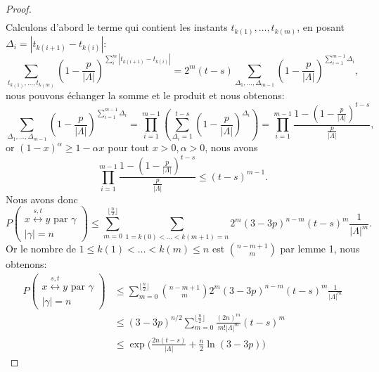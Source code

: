 \documentclass[titlepage,a4paper,12pt]{article}
\newcounter{d}
\newcounter{t}
\newcounter{p}
\newcounter{c}
\newcounter{a}
\newcounter{l}
\begin{document}
\begin{proof}
\begin{multline*}
\end{multline*}
Calculons d'abord le terme qui contient les instants $t_{k(1)},\dots,t_{k(m)}$, en posant $\Delta_i = |t_{k(i+1)}-t_{k(i)}|$:
$$\sum_{t_{k(1)},\dots,t_{k(m)}}(1-\frac{p}{|\Lambda|})^{\sum_i^{m}|t_{k(i+1)}-t_{k(i)}|} = 2^m(t-s)\sum_{\Delta_1,\dots,\Delta_{m-1}}(1-\frac{p}{|\Lambda|})^{\sum_{i=1}^{m-1}\Delta_i},
$$
nous pouvons échanger la somme et le produit et nous obtenons:
$$\sum_{\Delta_1,\dots,\Delta_{m-1}}(1-\frac{p}{|\Lambda|})^{\sum_{i=1}^{m-1}\Delta_i} = \prod_{i=1}^{m-1}(\sum_{\Delta_i = 1}^{t-s}(1-\frac{p}{|\Lambda|})^{\Delta_i})= \prod_{i=1}^{m-1}\frac{1-(1-\frac{p}{|\Lambda|})^{t-s}}{\frac{p}{|\Lambda|}},
$$
or $(1-x)^\alpha \geqslant 1-\alpha x$ pour tout $x>0,\alpha>0$, nous avons 
$$ \prod_{i=1}^{m-1}\frac{1-(1-\frac{p}{|\Lambda|})^{t-s}}{\frac{p}{|\Lambda|}} \leqslant(t-s)^{m-1}.
$$
Nous avons donc
$$P\left(\begin{array}{c}
x\overset{s,t}{\longleftrightarrow} y \text{ par }\gamma\\
|\gamma| = n
\end{array}\right) \leqslant\sum_{m=0}^{\lfloor\frac{n}{2}\rfloor}\sum_{1=k(0)<\dots<k(m+1)=n} 2^m(3-3p)^{n-m}(t-s)^m\frac{1}{|\Lambda|^m}.
$$
Or le nombre de $1\leqslant k(1)< \dots < k(m) \leqslant n$ est $\binom{n-m+1}{m}$ par lemme 1, nous obtenons:
\begin{align*}P\left(\begin{array}{c}
x\overset{s,t}{\longleftrightarrow} y \text{ par }\gamma\\
|\gamma| = n
\end{array}\right)& \leqslant\sum_{m=0}^{\lfloor\frac{n}{2}\rfloor}\binom{n-m+1}{m} 2^m(3-3p)^{n-m}(t-s)^m\frac{1}{|\Lambda|^m}\\
& \leqslant (3-3p)^{n/2}\sum_{m=0}^{\lfloor\frac{n}{2}\rfloor}\frac{(2n)^m}{m!|\Lambda|^m}(t-s)^m \\
&\leqslant \exp\big(\frac{2n(t-s)}{|\Lambda|}+\frac{n}{2}\ln(3-3p)\big)
\end{align*}
\end{proof}
\end{document}
